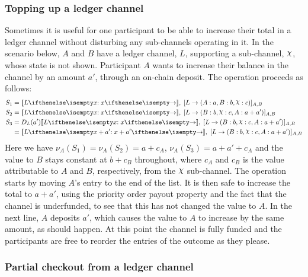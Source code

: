 \documentclass{article}
\begin{document}
\subsubsection{Topping up a ledger channel}

Sometimes it is useful for one participant to be able to increase their total in a ledger channel without disturbing any sub-channels operating in it.
In the scenario below, $A$ and $B$ have a ledger channel, $L$, supporting a sub-channel, $\rchi$, whose state is not shown.
Participant $A$ wants to increase their balance in the channel by an amount $a'$, through an on-chain deposit.
The operation proceeds as follows:
\begin{align*}
S_1 &= \adj{\holds{L}{x}{}}, \; \finalizable{L}{\alloc{A:a, B:b, \rchi: c}}{A, B} \\
S_2 &= \adj{\holds{L}{x}{}}, \; \finalizable{L}{\alloc{B: b, \rchi: c, A: a + a'}}{A, B} \\
S_3 &= D_L(a')\adj{\holds{L}{x}{}}, \; \finalizable{L}{\alloc{B: b, \rchi: c, A: a + a'}}{A, B} \\
    &= \adj{\holds{L}{x + a'}{}}, \; \finalizable{L}{\alloc{B: b, \rchi: c, A: a + a'}}{A, B}
\end{align*}
Here we have $\nu_A(S_1) = \nu_A(S_2) = a + c_A$, $\nu_A(S_3) = a + a' + c_A$ and the value to $B$ stays constant at $b + c_B$ throughout, where $c_A$ and $c_B$ is the value attributable to $A$ and $B$, respectively, from the $\rchi$ sub-channel.
The operation starts by moving $A$'s entry to the end of the list.
It is then safe to increase the total to $a + a'$, using the priority order payout property and the fact that the channel is underfunded, to see that this has not changed the value to $A$.
In the next line, $A$ deposits $a'$, which causes the value to $A$ to increase by the same amount, as should happen.
At this point the channel is fully funded and the participants are free to reorder the entries of the outcome as they please.

\subsubsection{Partial checkout from a ledger channel}
\end{document}
